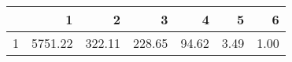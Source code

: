 \begin{table}[ht]
\centering
\begin{tabular}{rrrrrrr}
  \hline
 & 1 & 2 & 3 & 4 & 5 & 6 \\ 
  \hline
1 & 5751.22 & 322.11 & 228.65 & 94.62 & 3.49 & 1.00 \\ 
   \hline
\end{tabular}
\end{table}
